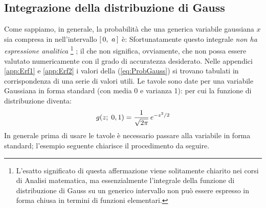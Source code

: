 \subsection{Integrazione della distribuzione di Gauss}

Come sappiamo, in generale, la probabilit\`a che una generica variabile
gaussiana $x$ sia compresa in nell'intervallo $\left[ \, 0, ~ a \, \right]$
\`e:
Sfortunatamente questo integrale {\itshape non ha espressione analitica}%
\footnote{
L'esatto significato di questa affermazione viene solitamente
chiarito nei corsi di Analisi matematica, ma essenzialmente l'integrale
della funzione di distribuzione di Gauss su un generico intervallo non
pu\`o essere espresso in forma chiusa in termini di funzioni
elementari.
}%
; il che non significa, ovviamente, che non possa essere valutato
numericamente con il grado di accuratezza desiderato.
Nelle appendici \ref{app:Erf1} e \ref{app:Erf2} i valori
della (\ref{eq:ProbGauss}) si trovano tabulati in corrispondenza di
una serie di valori utili.
Le tavole sono date per una variabile Gaussiana in forma standard
(con media 0 e varianza 1):
per cui la funzione di distribuzione diventa:
$$
g(z; \; 0, 1) = \frac{1}{\sqrt{2\pi}} \, e^{-z^2/2}
$$
In generale prima di usare le tavole \`e necessario passare alla
variabile in forma standard; l'esempio seguente chiarisce il
procedimento da seguire.

